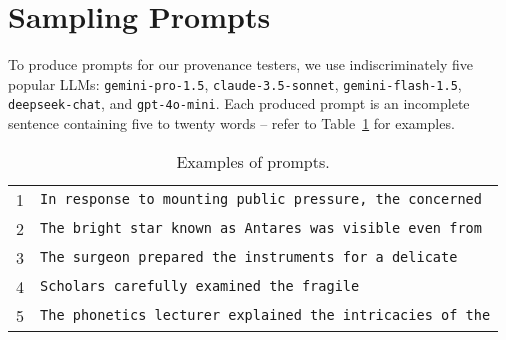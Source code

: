 \section{Sampling Prompts}
\label{sec:appendix:sampling_prompts}
To produce prompts for our provenance testers, we use indiscriminately five popular LLMs: \texttt{gemini-pro-1.5},
 \texttt{claude-3.5-sonnet},
 \texttt{gemini-flash-1.5},
 \texttt{deepseek-chat}, and
 \texttt{gpt-4o-mini}. 
Each produced prompt is an incomplete sentence containing five to twenty words -- refer to Table~\ref{tbl:eval:prompts} for examples. 
%

\begin{table}[h]
\setlength{\tabcolsep}{5pt}
\begin{center}
\caption{Examples of prompts.}
\label{tbl:eval:prompts}
\footnotesize
\begin{tabular}{ll}
1 & \texttt{In response to mounting public pressure, the concerned} \\
2 & \texttt{The bright star known as Antares was visible even from} \\
3 & \texttt{The surgeon prepared the instruments for a delicate} \\
4 & \texttt{Scholars carefully examined the fragile} \\
5 & \texttt{The phonetics lecturer explained the intricacies of the}
\end{tabular}
\end{center}
\end{table}
